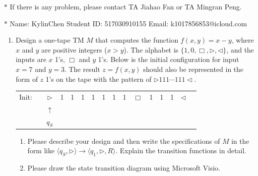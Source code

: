 \documentclass[12pt,a4paper]{article}
\theoremstyle{definition}
\begin{document}
\noindent

\noindent{}
\begin{center}
\footnotesize{\color{red}$*$ If there is any problem, please contact TA Jiahao Fan or TA Mingran Peng.}

\footnotesize{\color{blue}$*$ Name: KylinChen  \quad Student ID: 517030910155 \quad Email: k1017856853@icloud.com}
\end{center}

\begin{enumerate}
    \item
    Design a one-tape TM $M$ that computes the function $f(x, y) = x - y$, where $x$ and $y$ are positive integers ($x > y$). The alphabet is $\{1, 0, \Box, \triangleright, \triangleleft\}$, and the inputs are $x$ 1's, $\Box$ and $y$ 1's. Below is the initial configuration for input $x=7$ and $y=3$. The result $z=f(x, y)$ should also be represented in the form of $z$ 1's on the tape with the pattern of $\triangleright 111 \cdots 111 \triangleleft$.

    \begin{center}
    \begin{tabular}{ll|c|c|c|c|c|c|c|c|c|c|c|c|c|c}
    	\cline{2-16}
    	Init:& & $\triangleright$ &  1  & 1 & 1 & 1 & 1 & 1 & 1 & $\Box$ & 1 & 1 & 1 & $ \triangleleft$ & \\
    	\cline{2-16}
    	\multicolumn{2}{c}{} & \multicolumn{1}{c}{$\uparrow$} & \multicolumn{11}{c}{}\\
    	\multicolumn{2}{c}{} & \multicolumn{1}{c}{$q_S$} & \multicolumn{11}{c}{}\\
    \end{tabular}
    \end{center}

    \begin{enumerate}
        \item
        Please describe your design and then write the specifications of $M$ in the form like $\langle q_S, \triangleright \rangle \rightarrow \langle q_1, \triangleright,  R\rangle$. Explain the transition functions in detail.

        \item
        Please draw the state transition diagram using Microsoft Visio.


\end{enumerate}
\end{enumerate}
\end{document}
